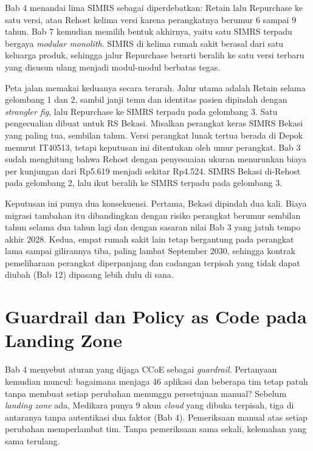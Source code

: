\begin{kasus}[title={Kasus Medikara Health: Memutuskan Lima SIMRS yang Diperdebatkan}]
  Bab 4 menandai lima SIMRS sebagai diperdebatkan: Retain lalu Repurchase ke satu versi, atau
  Rehost kelima versi karena perangkatnya berumur 6 sampai 9 tahun. Bab 7 kemudian memilih bentuk
  akhirnya, yaitu satu SIMRS terpadu bergaya \textit{modular monolith}. SIMRS di kelima rumah sakit
  berasal dari satu keluarga produk, sehingga jalur Repurchase berarti beralih ke satu versi terbaru
  yang disusun ulang menjadi modul-modul berbatas tegas.

  Peta jalan memakai keduanya secara terarah. Jalur utama adalah Retain selama gelombang 1 dan 2,
  sambil janji temu dan identitas pasien dipindah dengan \textit{strangler fig}, lalu Repurchase ke
  SIMRS terpadu pada gelombang 3. Satu pengecualian dibuat untuk RS Bekasi. Misalkan perangkat keras
  SIMRS Bekasi yang paling tua, sembilan tahun. Versi perangkat lunak tertua berada di Depok menurut
  IT40513, tetapi keputusan ini ditentukan oleh umur perangkat. Bab 3 sudah menghitung bahwa Rehost
  dengan penyesuaian ukuran menurunkan biaya per kunjungan dari Rp5.619 menjadi sekitar Rp4.524.
  SIMRS Bekasi di-Rehost pada gelombang 2, lalu ikut beralih ke SIMRS terpadu pada gelombang 3.

  Keputusan ini punya dua konsekuensi. Pertama, Bekasi dipindah dua kali. Biaya migrasi tambahan itu
  dibandingkan dengan risiko perangkat berumur sembilan tahun selama dua tahun lagi dan dengan
  sasaran nilai Bab 3 yang jatuh tempo akhir 2028. Kedua, empat rumah sakit lain tetap bergantung
  pada perangkat lama sampai gilirannya tiba, paling lambat September 2030, sehingga kontrak
  pemeliharaan perangkat diperpanjang dan cadangan terpisah yang tidak dapat diubah (Bab 12)
  dipasang lebih dulu di sana.
\end{kasus}

\section{Guardrail dan Policy as Code pada Landing Zone}
\label{sec:ch14-guardrail}

Bab 4 menyebut aturan yang dijaga CCoE sebagai \textit{guardrail}. Pertanyaan kemudian muncul:
bagaimana menjaga 46 aplikasi dan beberapa tim tetap patuh tanpa membuat setiap perubahan menunggu
persetujuan manual? Sebelum \textit{landing zone} ada, Medikara punya 9 akun \textit{cloud} yang
dibuka terpisah, tiga di antaranya tanpa autentikasi dua faktor (Bab 4). Pemeriksaan manual atas
setiap perubahan memperlambat tim. Tanpa pemeriksaan sama sekali, kelemahan yang sama terulang.

